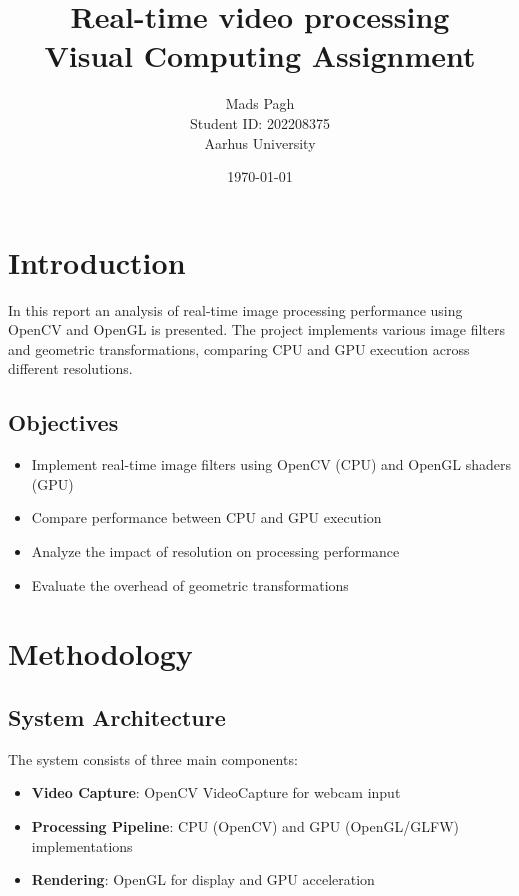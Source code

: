 \documentclass[12pt,a4paper]{article}
\title{Real-time video processing\\
\large Visual Computing Assignment}
\author{Mads Pagh\\
Student ID: 202208375\\
Aarhus University}
\date{\today}
\begin{document}
\maketitle
\newpage

\tableofcontents
\newpage

\section{Introduction}
In this report an analysis of real-time image processing performance using OpenCV and OpenGL is presented. The project implements various image filters and geometric transformations, comparing CPU and GPU execution across different resolutions.

\subsection{Objectives}
\begin{itemize}
    \item Implement real-time image filters using OpenCV (CPU) and OpenGL shaders (GPU)
    \item Compare performance between CPU and GPU execution
    \item Analyze the impact of resolution on processing performance
    \item Evaluate the overhead of geometric transformations
\end{itemize}

\section{Methodology}

\subsection{System Architecture}
The system consists of three main components:
\begin{itemize}
    \item \textbf{Video Capture}: OpenCV VideoCapture for webcam input
    \item \textbf{Processing Pipeline}: CPU (OpenCV) and GPU (OpenGL/GLFW) implementations
    \item \textbf{Rendering}: OpenGL for display and GPU acceleration
\end{itemize}
\end{document}
